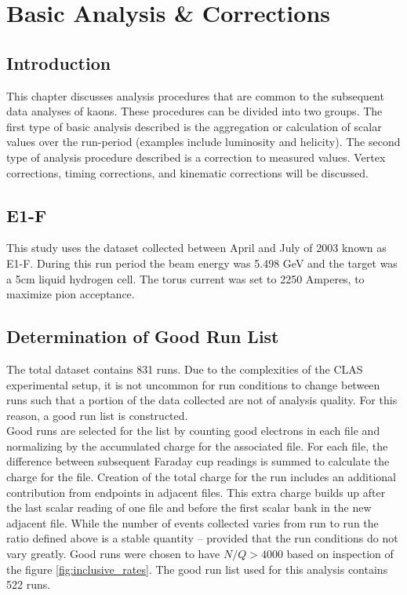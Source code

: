 \chapter{Basic Analysis \& Corrections}

\section{Introduction}
This chapter discusses analysis procedures that are common to the subsequent data analyses of kaons.  These procedures can be divided into two groups.  The first type of basic analysis described is the aggregation or calculation of scalar values over the run-period (examples include luminosity and helicity).  The second type of analysis procedure described is a correction to measured values.  Vertex corrections, timing corrections, and kinematic corrections will be discussed.

\section{E1-F}
This study uses the dataset collected between April and July of 2003 known as E1-F.  During this run period the beam energy was 5.498 GeV and the target was a 5cm liquid hydrogen cell.  The torus current was set to 2250 Amperes, to maximize pion acceptance.

\section{Determination of Good Run List}
The total dataset contains 831 runs.  Due to the complexities of the CLAS experimental setup, it is not uncommon for run conditions to change between runs such that a portion of the data collected are not of analysis quality.  For this reason, a good run list is constructed. \\

Good runs are selected for the list by counting good electrons in each file and normalizing by the accumulated charge for the associated file.  For each file, the difference between subsequent Faraday cup readings is summed to calculate the charge for the file.  Creation of the total charge for the run includes an additional contribution from endpoints in adjacent files.  This extra charge builds up after the last scalar reading of one file and before the first scalar bank in the new adjacent file.  While the number of events collected varies from run to run the ratio defined above is a stable quantity -- provided that the run conditions do not vary greatly.  Good runs were chosen to have $N/Q > 4000$ based on inspection of the figure \ref{fig:inclusive_rates}.  The good run list used for this analysis contains 522 runs.  

